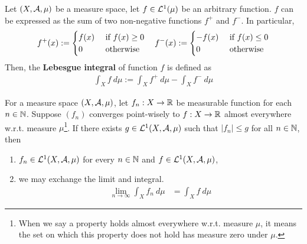 \documentclass[11pt]{article}
\begin{document}
	\begin{definition}
	    Let $(X, \mathcal{{A}}, \mu)$ be a measure space, let $f \in \mathcal{{L}}^1(\mu)$ be an arbitrary function. $f$ can be expressed as the sum of two non-negative functions $f^+$ and $f^-$.
	    In particular,
	    \begin{align}
	        f^+(x) := \begin{cases}
	            f(x) &\text{{ if }} f(x) \geq 0 \\
	            0 &\text{{ otherwise}}
	        \end{cases}\quad
	        f^-(x) := \begin{cases}
	            -f(x) &\text{{ if }} f(x) \leq 0 \\
	            0 &\text{{ otherwise}}
	        \end{cases}
	    \end{align}
	    Then, the \textbf{Lebesgue integral} of function $f$ is defined as
	    \begin{align}
	        \int_X f\ d\mu := \int_X f^+\ d\mu - \int_X f^-\ d\mu
	    \end{align}
	\end{definition}
	
	\begin{theorem}
        For a measure space $(X, \mathcal{{A}}, \mu)$, let $f_n: X \to \mathbb{R}$ be measurable function for each $n \in \mathbb{N}$.
        Suppose $(f_n)$ converges point-wisely to $f: X \to \mathbb{R}$ almost everywhere w.r.t. measure $\mu$\footnote{When we say a property holds almost everywhere w.r.t. measure $\mu$, it means the set on which this property does not hold has measure zero under $\mu$.}.
        If there exists $g \in \mathcal{{L}}^1(X, \mathcal{{A}}, \mu)$ such that $|f_n| \leq g$ for all $n \in \mathbb{N}$, then
        \begin{enumerate}
            \item $f_n \in \mathcal{{L}}^1(X, \mathcal{{A}}, \mu)$ for every $n \in \mathbb{N}$ and $f \in \mathcal{{L}}^1(X, \mathcal{{A}}, \mu)$,
            \item we may exchange the limit and integral.
            \begin{align}
                \lim_{n \to \infty} \int_X f_n\ d\mu &= \int_X f\ d\mu
            \end{align}
        \end{enumerate}
	\end{theorem}
	
\end{document}
